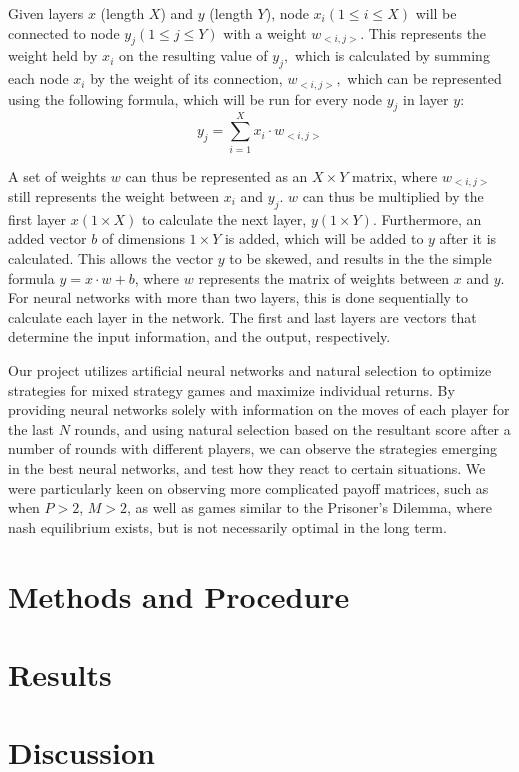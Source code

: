 \documentclass{article}
\begin{document}
Given layers $x$ (length $X$) and $y$ (length $Y$), node $x_i(1\leq i \leq X)$ will be connected to node $y_j (1\leq j \leq Y)$ with a weight $w_{<i,j>}$. This represents the weight held by $x_i$ on the resulting value of $y_j,$ which is calculated by summing each node $x_i$ by the weight of its connection, $w_{<i,j>},$ which can be represented using the following formula, which will be run for every node $y_j$ in layer $y$: $$y_j=\sum_{i=1}^X x_i\cdot w_{<i,j>}$$

A set of weights $w$ can thus be represented as an $X\times Y$ matrix, where $w_{<i,j>}$ still represents the weight between $x_i$ and $y_j$. $w$ can thus be multiplied by the first layer $x (1\times X)$ to calculate the next layer, $y (1\times Y)$. Furthermore, an added vector $b$ of dimensions $1\times Y$ is added, which will be added to $y$ after it is calculated. This allows the vector $y$ to be skewed, and results in the the simple formula $y = x\cdot w+b$, where $w$ represents the matrix of weights between $x$ and $y$. For neural networks with more than two layers, this is done sequentially to calculate each layer in the network. The first and last layers are vectors that determine the input information, and the output, respectively.

Our project utilizes artificial neural networks and natural selection to optimize strategies for mixed strategy games and maximize individual returns. By providing neural networks solely with information on the moves of each player for the last $N$ rounds, and using natural selection based on the resultant score after a number of rounds with different players, we can observe the strategies emerging in the best neural networks, and test how they react to certain situations. We were particularly keen on observing more complicated payoff matrices, such as when $P>2$, $M>2$, as well as games similar to the Prisoner's Dilemma, where nash equilibrium exists, but is not necessarily optimal in the long term.

\section{Methods and Procedure}

\section{Results}

\section{Discussion}
\end{document}
